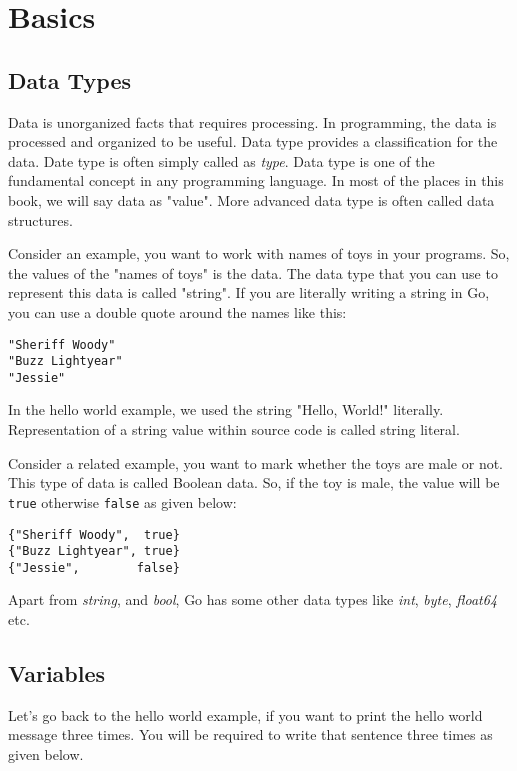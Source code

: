 \section{Basics}

\subsection{Data Types}

Data is unorganized facts that requires
processing.  In programming, the data is processed and organized to be
useful.  Data type provides a classification for the data.  Date type
is often simply called as
\textit{type}.  Data type is one of the fundamental concept in any
programming language.  In most of the places in this book, we will say
data as "value".  More advanced data type is often called data
structures.

Consider an example, you want to work with names of toys in your
programs.  So, the values of the "names of toys" is the data.  The
data type that you can use to represent this data is called "string".
If you are literally writing a string in Go, you can use a double
quote around the names like this:

\begin{lstlisting}[numbers=none]
"Sheriff Woody"
"Buzz Lightyear"
"Jessie"
\end{lstlisting}

In the hello world example, we used the string "Hello, World!"
literally.  Representation of a string value within source code is
called string literal.

Consider a related example, you want to mark whether the toys are male
or not.  This type of data is called Boolean data.  So, if the toy is
male, the value will be \texttt{true} otherwise \texttt{false} as
given below:

\begin{lstlisting}[numbers=none]
{"Sheriff Woody",  true}
{"Buzz Lightyear", true}
{"Jessie",        false}
\end{lstlisting}

Apart from \textit{string}, and \textit{bool}, Go has some other data
types like \textit{int}, \textit{byte}, \textit{float64} etc.

\subsection{Variables}

Let's go back to the hello world example, if you want to print the
hello world message three times.  You will be required to write that
sentence three times as given below.

